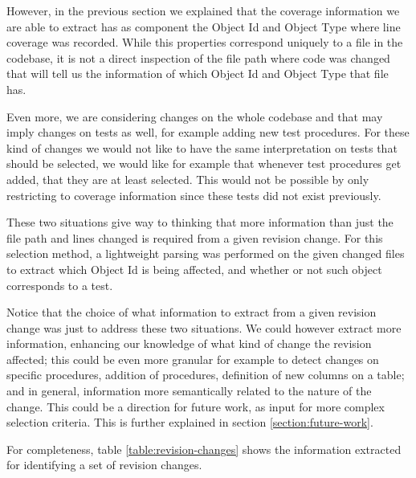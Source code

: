 \documentclass{article}
\begin{document}
However, in the previous section we explained that the coverage information we are able to extract has as component the Object Id and Object Type where line coverage was recorded. While this properties correspond uniquely to a file in the codebase, it is not a direct inspection of the file path where code was changed that will tell us the information of which Object Id and Object Type that file has.

Even more, we are considering changes on the whole codebase and that may imply changes on tests as well, for example adding new test procedures. For these kind of changes we would not like to have the same interpretation on tests that should be selected, we would like for example that whenever test procedures get added, that they are at least selected. This would not be possible by only restricting to coverage information since these tests did not exist previously.

These two situations give way to thinking that more information than just the file path and lines changed is required from a given revision change. For this selection method, a lightweight parsing was performed on the given changed files to extract which Object Id is being affected, and whether or not such object corresponds to a test.

Notice that the choice of what information to extract from a given revision change was just to address these two situations. We could however extract more information, enhancing our knowledge of what kind of change the revision affected; this could be even more granular for example to detect changes on specific procedures, addition of procedures, definition of new columns on a table; and in general, information more semantically related to the nature of the change. This could be a direction for future work, as input for more complex selection criteria. This is further explained in section \ref{section:future-work}.

For completeness, table \ref{table:revision-changes} shows the information extracted for identifying a set of revision changes. 
\end{document}
